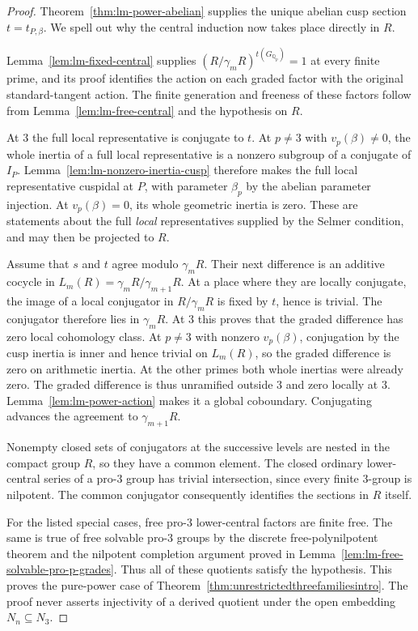 \begin{proof}
Theorem~\ref{thm:lm-power-abelian} supplies the unique
abelian cusp section $t=t_{P,\beta}$.  We spell out why
the central induction now takes place directly in $R$.

Lemma~\ref{lem:lm-fixed-central} supplies
$(R/\gamma_mR)^{t(G_{\mathbb Q_p})}=1$ at every finite prime,
and its proof identifies the action on each graded factor with
the original standard-tangent action.  The finite generation and
freeness of these factors follow from
Lemma~\ref{lem:lm-free-central} and the hypothesis on $R$.

At $3$ the full local representative is conjugate
to $t$.  At $p\ne3$ with $v_p(\beta)\ne0$, the
whole inertia of a full local representative is
a nonzero subgroup of a conjugate of $I_P$.
Lemma~\ref{lem:lm-nonzero-inertia-cusp} therefore makes the
full local representative cuspidal at $P$, with parameter
$\beta_p$ by the abelian parameter injection.  At $v_p(\beta)=0$, its
whole geometric inertia is zero.  These are
statements about the full \emph{local} representatives
supplied by the Selmer condition, and may then
be projected to $R$.

Assume that $s$ and $t$ agree modulo $\gamma_mR$.
Their next difference is an additive cocycle in
$L_m(R)=\gamma_mR/\gamma_{m+1}R$.
At a place where they are locally conjugate,
the image of a local conjugator in $R/\gamma_mR$
is fixed by $t$, hence is trivial.  The conjugator
therefore lies in $\gamma_mR$.
At $3$ this proves that the graded difference
has zero local cohomology class.  At $p\ne3$ with
nonzero $v_p(\beta)$, conjugation by the cusp inertia
is inner and hence trivial on $L_m(R)$, so the
graded difference is zero on arithmetic inertia.
At the other primes both whole inertias were
already zero.  The graded difference is thus
unramified outside $3$ and zero locally at $3$.
Lemma~\ref{lem:lm-power-action} makes it a global
coboundary.  Conjugating advances the agreement
to $\gamma_{m+1}R$.

Nonempty closed sets of conjugators at the
successive levels are nested in the compact
group $R$, so they have a common element.
The closed ordinary lower-central series of a
pro-$3$ group has trivial intersection, since
every finite $3$-group is nilpotent.  The common
conjugator consequently identifies the sections
in $R$ itself.

For the listed special cases, free pro-$3$
lower-central factors are finite free.  The
same is true of free solvable pro-$3$ groups
by the discrete free-polynilpotent theorem and
the nilpotent completion argument proved in
Lemma~\ref{lem:lm-free-solvable-pro-p-grades}.
Thus all of these quotients satisfy the
hypothesis. This proves the pure-power case of
Theorem~\ref{thm:unrestrictedthreefamiliesintro}.  The proof never
asserts injectivity of a derived quotient under the open embedding
$N_n\subseteq N_3$.
\end{proof}

